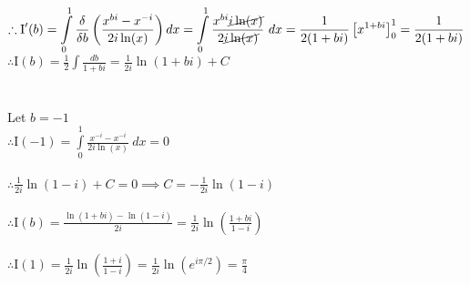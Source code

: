 \documentclass[20pt]{article}
\begin{document}
\begin{large}
	$\therefore \displaystyle \text{I}'(b) = \int\limits_0^1 \frac{\delta}{\delta b}\left(\frac{x^{bi}-x^{-i}}{2i\ln(x)}\right)dx = \int\limits_0^1 \frac{x^{bi}\cancel{i\ln(x)}}{2\cancel{i\ln(x)}} \ dx = \frac{1}{2(1+bi)}\left[x^{1+bi}\right]_0^1 = \frac{1}{2(1+bi)}$ \\
	$\displaystyle \therefore \text{I}(b) = \frac{1}{2}\int\frac{db}{1+bi} = \frac{1}{2i}\ln(1+bi)+C$ \\ \\ \\
	Let $b = -1$ \\
	$\displaystyle \therefore \text{I}(-1) = \int\limits_0^1\frac{x^{-i}-x^{-i}}{2i\ln(x)} \ dx = 0$ \\ \\
	$\displaystyle\therefore \frac{1}{2i}\ln(1-i) + C = 0 \implies C = -\frac{1}{2i}\ln(1-i)$ \\ \\
	$\displaystyle \therefore \text{I}(b) = \frac{\ln(1+bi)-\ln(1-i)}{2i} = \frac{1}{2i}\ln\left(\frac{1+bi}{1-i}\right)$ \\ \\
	$\displaystyle \therefore \text{I}(1) = \frac{1}{2i}\ln\left(\frac{1+i}{1-i}\right) = \frac{1}{2i}\ln\left(e^{i\pi/2}\right) = \boxed{\frac{\pi}{4}}$
\end{large}
\end{document}

